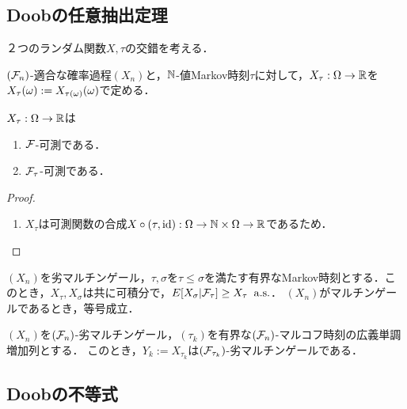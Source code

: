 \documentclass[uplatex,dvipdfmx]{jsreport}
\begin{document}
\subsection{Doobの任意抽出定理}

\begin{tcolorbox}[colframe=ForestGreen, colback=ForestGreen!10!white,breakable,colbacktitle=ForestGreen!40!white,coltitle=black,fonttitle=\bfseries\sffamily,
title=]
    ２つのランダム関数$X,\tau$の交錯を考える．
\end{tcolorbox}

\begin{definition}
    $(\mathcal{F}_n)$-適合な確率過程$(X_n)$と，$\mathbb{N}$-値Markov時刻$\tau$に対して，$X_\tau:\Omega\to\mathbb{R}$を$X_\tau(\omega):=X_{\tau(\omega)}(\omega)$で定める．
\end{definition}

\begin{lemma}
    $X_\tau:\Omega\to\mathbb{R}$は
    \begin{enumerate}
        \item $\mathcal{F}$-可測である．
        \item $\mathcal{F}_\tau$-可測である．
    \end{enumerate}
\end{lemma}
\begin{proof}\mbox{}
    \begin{enumerate}
        \item $X_\tau$は可測関数の合成$X\circ (\tau,\mathrm{id}):\Omega\to\mathbb{N}\times\Omega\to\mathbb{R}$であるため．
    \end{enumerate}
\end{proof}

\begin{theorem}[有界停止時刻によるマルチンゲール性の保存]
    $(X_n)$を劣マルチンゲール，$\tau,\sigma$を$\tau\le\sigma$を満たす有界なMarkov時刻とする．このとき，$X_\tau,X_\sigma$は共に可積分で，$E[X_\sigma|\mathcal{F}_\tau]\ge X_\tau\;\;\mathrm{a.s.}$．
    $(X_n)$がマルチンゲールであるとき，等号成立．
\end{theorem}

\begin{corollary}
    $(X_n)$を$(\mathcal{F}_n)$-劣マルチンゲール，$(\tau_k)$を有界な$(\mathcal{F}_n)$-マルコフ時刻の広義単調増加列とする．
    このとき，$Y_k:=X_{\tau_k}$は$(\mathcal{F}_{\tau_k})$-劣マルチンゲールである．
\end{corollary}

\subsection{Doobの不等式}
\end{document}
